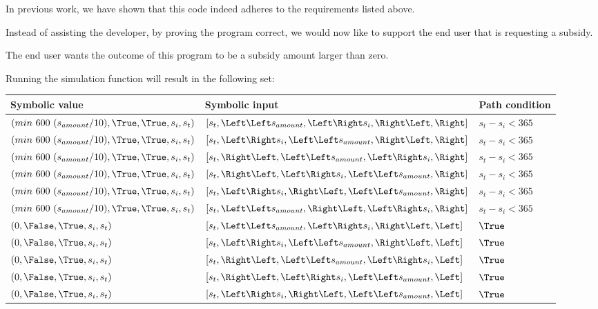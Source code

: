 In previous work, we have shown that this code indeed adheres to the requirements listed above.

Instead of assisting the developer, by proving the program correct, we would now like to support the end user that is requesting a subsidy.

The end user wants the outcome of this program to be a subsidy amount larger than zero.

Running the simulation function will result in the following set:

\begin{tabular}{l|l|l}
  Symbolic value & Symbolic input & Path condition\\
  \hline
  $(min\ 600\ (s_{amount}/10),  \True, \True, s_i, s_t)$ & $[s_t,\Left \Left s_{amount}, \Left \Right s_i, \Right \Left, \Right]$ & $s_t-s_i<365$\\
  $(min\ 600\ (s_{amount}/10),  \True, \True, s_i, s_t)$ & $[s_t,\Left \Right s_i, \Left \Left s_{amount}, \Right \Left, \Right]$ & $s_t-s_i<365$\\
  $(min\ 600\ (s_{amount}/10),  \True, \True, s_i, s_t)$ & $[s_t,\Right \Left, \Left \Left s_{amount}, \Left \Right s_i, \Right]$ & $s_t-s_i<365$\\
  $(min\ 600\ (s_{amount}/10),  \True, \True, s_i, s_t)$ & $[s_t,\Right \Left, \Left \Right s_i, \Left \Left s_{amount}, \Right]$ & $s_t-s_i<365$\\
  $(min\ 600\ (s_{amount}/10),  \True, \True, s_i, s_t)$ & $[s_t,\Left \Right s_i, \Right \Left, \Left \Left s_{amount}, \Right]$ & $s_t-s_i<365$\\
  $(min\ 600\ (s_{amount}/10),  \True, \True, s_i, s_t)$ & $[s_t,\Left \Left s_{amount}, \Right \Left, \Left \Right s_i, \Right]$ & $s_t-s_i<365$\\
  $(                        0, \False, \True, s_i, s_t)$ & $[s_t,\Left \Left s_{amount}, \Left \Right s_i, \Right \Left, \Left]$  & $\True$\\
  $(                        0, \False, \True, s_i, s_t)$ & $[s_t,\Left \Right s_i, \Left \Left s_{amount}, \Right \Left, \Left]$  & $\True$\\
  $(                        0, \False, \True, s_i, s_t)$ & $[s_t,\Right \Left, \Left \Left s_{amount}, \Left \Right s_i, \Left]$  & $\True$\\
  $(                        0, \False, \True, s_i, s_t)$ & $[s_t,\Right \Left, \Left \Right s_i, \Left \Left s_{amount}, \Left]$  & $\True$\\
  $(                        0, \False, \True, s_i, s_t)$ & $[s_t,\Left \Right s_i, \Right \Left, \Left \Left s_{amount}, \Left]$  & $\True$\\

\end{tabular}
